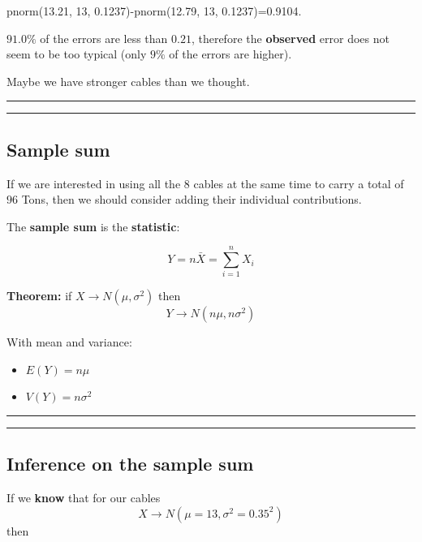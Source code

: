 \documentclass[
]{book}
\providecommand{\tightlist}{%
  \setlength{\itemsep}{0pt}\setlength{\parskip}{0pt}}
\begin{document}
pnorm(13.21, 13, 0.1237)-pnorm(12.79, 13, 0.1237)=0.9104.

\(91.0\%\) of the errors are less than \(0.21\), therefore the \textbf{observed} error does not seem to be too typical (only \(9\%\) of the errors are higher).

Maybe we have stronger cables than we thought.

\begin{center}\rule{0.5\linewidth}{0.5pt}\end{center}

\begin{center}\rule{0.5\linewidth}{0.5pt}\end{center}

\hypertarget{sample-sum}{%
\subsection{Sample sum}\label{sample-sum}}

If we are interested in using all the \(8\) cables at the same time to carry a total of \(96\) Tons, then we should consider adding their individual contributions.

The \textbf{sample sum} is the \textbf{statistic}:

\[Y=n \bar{X}=\sum_{i=1}^n X_i\]

\textbf{Theorem:} if \(X \rightarrow N(\mu, \sigma^2)\) then \[Y \rightarrow N(n\mu, n\sigma^2)\]

With mean and variance:

\begin{itemize}
\tightlist
\item
  \(E(Y)=n\mu\)
\item
  \(V(Y)=n\sigma^2\)
\end{itemize}

\begin{center}\rule{0.5\linewidth}{0.5pt}\end{center}

\begin{center}\rule{0.5\linewidth}{0.5pt}\end{center}

\hypertarget{inference-on-the-sample-sum}{%
\subsection{Inference on the sample sum}\label{inference-on-the-sample-sum}}

If we \textbf{know} that for our cables \[X \rightarrow N(\mu=13, \sigma^2=0.35^2)\] then
\end{document}
